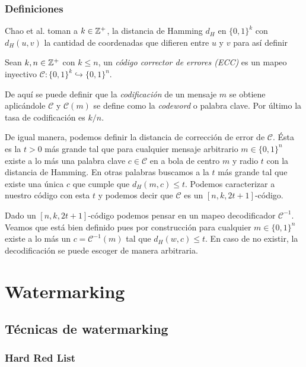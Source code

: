 \documentclass[a4paper,11pt]{article}
\begin{document}
\subsubsection{Definiciones}
\label{sec:def}
Chao et al. \cite{chao_watermarking_2025} toman a $k\in\mathbb{Z}^+$, la distancia de Hamming $d_H$ en $\{0,1\}^k$ con $d_H(u,v)$ la cantidad de coordenadas que difieren entre $u$ y $v$ \cite{kerl_introduction_2004} para así definir 
\begin{definition}
    \label{def:ecc}
    Sean $k,n\in\mathbb{Z}^+$ con $k\leqslant n$, un \textit{código corrector de errores (ECC)} es un mapeo inyectivo $\mathcal{C}:\{0,1\}^k\hookrightarrow\{0,1\}^n$.
\end{definition}
\par De aquí se puede definir que la \textit{codificación} de un mensaje $m$ se obtiene aplicándole $\mathcal{C}$ y $\mathcal{C}(m)$ se define como la \textit{codeword} o palabra clave. Por último la tasa de codificación es $k/n$.
\par De igual manera, podemos definir la distancia de corrección de error de $\mathcal{C}$. Ésta es la $t>0$ más grande tal que para cualquier mensaje arbitrario $m\in\{0,1\}^n$ existe a lo más una palabra clave $c\in\mathcal{C}$ en a bola de centro $m$ y radio $t$ con la distancia de Hamming. En otras palabras buscamos a la $t$ más grande tal que existe una única $c$ que cumple que $d_H(m,c)\leqslant t$. Podemos caracterizar a nuestro código con esta $t$ y podemos decir que $\mathcal{C}$ es un $[n, k, 2t+1]$-código.
\par Dado un $[n, k, 2t+1]$-código podemos pensar en un mapeo decodificador $\mathcal C^{-1}$. Veamos que está bien definido pues por construcción para cualquier $m\in\{0,1\}^n$ existe a lo más un $c=\mathcal{C}^{-1}(m)$ tal que $d_H(w,c)\leqslant t$. En caso de no existir, la decodificación se puede escoger de manera arbitraria.
\section{Watermarking}
\subsection{Técnicas de watermarking}
\subsubsection{Hard Red List}
\end{document}
